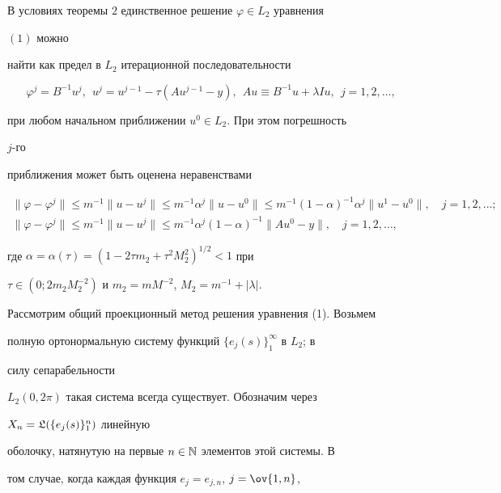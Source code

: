 \begin{thm}


В условиях теоремы $2$ единственное решение $\varphi\in L_2$ уравнения 


$(1)$ можно 


найти как предел в $L_2$ итерационной последовательности


$$


\varphi^j=B^{-1}u^j,\ \ u^j=u^{j-1}-\tau


(A u^{j-1}-y),\ \ A u\equiv B^{-1}u+\lambda I u,\ \ j=1,2,\dotsc,


$$


при любом начальном приближении $u^0\in L_2$. При этом погрешность 


$j$-го 


приближения может быть оценена неравенствами


\begin{gather*}


\|\varphi-\varphi^j\|\le m^{-1}\|u-u^j\|\le m^{-1}\alpha^j


\|u-u^0\|\le m^{-1}(1-\alpha)^{-1}\alpha^j


\|u^1-u^0\|,\quad j=1,2,\dotsc;\\


\|\varphi-\varphi^j\|\le m^{-1}\|u-u^j\|\le m^{-1}


\alpha^j(1-\alpha)^{-1}\|A u^0-y\|,\quad j=1,2,\dotsc,


\end{gather*}


где $\alpha=\alpha(\tau)=(1-2\tau m_2+\tau^2M^2_2)^{1/2}<1$ при 


$\tau\in(0;2m_2M^{-2}_2)$ и $m_2=m M^{-2}$, $M_2=m^{-1}+|\lambda|$.


\end{thm}





Рассмотрим общий проекционный метод решения уравнения (1). Возьмем 


полную ортонормальную систему функций $\{e_j(s)\}^\infty_1$ в $L_2$; в 


силу сепарабельности 


$L_2(0,2\pi)$ такая система всегда существует. Обозначим через 


$X_n=\frak L(\{e_j(s)\}^n_1)$ линейную 


оболочку, натянутую на первые $n\in\Bbb N$ элементов этой системы. В 


том случае, когда каждая функция $e_j=e_{j,n}$, $j=\ov{1,n}$,


